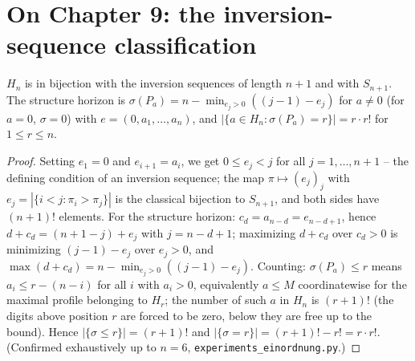 \section*{On Chapter 9: the inversion-sequence classification}

\begin{satz}[Register S44]
$H_n$ is in bijection with the inversion sequences of length
$n{+}1$ and with $S_{n+1}$. The structure horizon is
$\sigma(P_a)=n-\min_{e_j>0}((j{-}1)-e_j)$ for $a\ne0$ (for $a=0$,
$\sigma=0$) with $e=(0,a_1,\ldots,a_n)$, and
$|\{a\in H_n:\sigma(P_a)=r\}|=r\cdot r!$ for $1\le r\le n$.
\end{satz}

\begin{proof}
Setting $e_1=0$ and $e_{i+1}=a_i$, we get $0\le e_j<j$ for all
$j=1,\ldots,n{+}1$ -- the defining condition of an inversion
sequence; the map $\pi\mapsto(e_j)_j$ with
$e_j=|\{i<j:\pi_i>\pi_j\}|$ is the classical bijection to
$S_{n+1}$, and both sides have $(n{+}1)!$ elements. For the
structure horizon: $c_d=a_{n-d}=e_{n-d+1}$, hence
$d+c_d=(n{+}1-j)+e_j$ with $j=n-d+1$; maximizing $d+c_d$ over
$c_d>0$ is minimizing $(j{-}1)-e_j$ over $e_j>0$, and
$\max(d+c_d)=n-\min_{e_j>0}((j{-}1)-e_j)$. Counting:
$\sigma(P_a)\le r$
means $a_i\le r-(n-i)$ for all $i$ with $a_i>0$, equivalently
$a\le M$ coordinatewise for the maximal profile belonging to
$H_r$; the number of such $a$ in $H_n$ is $(r{+}1)!$ (the digits
above position $r$ are forced to be zero, below they are free up
to the bound). Hence $|\{\sigma\le r\}|=(r{+}1)!$ and
$|\{\sigma=r\}|=(r{+}1)!-r!=r\cdot r!$. (Confirmed exhaustively
up to $n=6$, \texttt{experiments\_einordnung.py}.)
\end{proof}
